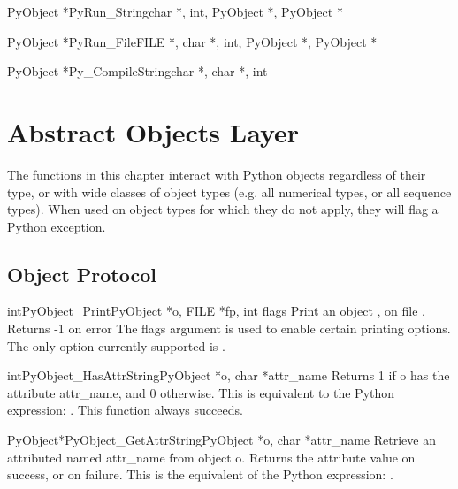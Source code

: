 \begin{cfuncdesc}{}{PyObject *PyRun_String}{char *, int, PyObject *, PyObject *}
\end{cfuncdesc}

\begin{cfuncdesc}{}{PyObject *PyRun_File}{FILE *, char *, int, PyObject *, PyObject *}
\end{cfuncdesc}

\begin{cfuncdesc}{}{PyObject *Py_CompileString}{char *, char *, int}
\end{cfuncdesc}


\chapter{Abstract Objects Layer}

The functions in this chapter interact with Python objects regardless
of their type, or with wide classes of object types (e.g. all
numerical types, or all sequence types).  When used on object types
for which they do not apply, they will flag a Python exception.

\section{Object Protocol}

\begin{cfuncdesc}{int}{PyObject_Print}{PyObject *o, FILE *fp, int flags}
Print an object , on file .  Returns -1 on error
The flags argument is used to enable certain printing
options. The only option currently supported is . 
\end{cfuncdesc}

\begin{cfuncdesc}{int}{PyObject_HasAttrString}{PyObject *o, char *attr_name}
Returns 1 if o has the attribute attr_name, and 0 otherwise.
This is equivalent to the Python expression:
.
This function always succeeds.
\end{cfuncdesc}

\begin{cfuncdesc}{PyObject*}{PyObject_GetAttrString}{PyObject *o, char *attr_name}
Retrieve an attributed named attr_name from object o.
Returns the attribute value on success, or \NULL{} on failure.
This is the equivalent of the Python expression: .
\end{cfuncdesc}


